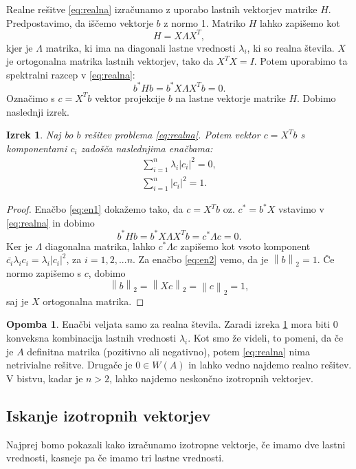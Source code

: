 \documentclass[12pt,a4paper]{amsart}
\theoremstyle{definition}
\newtheorem{opomba}[definicija]{Opomba}
\theoremstyle{plain}
\newtheorem{izrek}[definicija]{Izrek}
\newcommand{\abs}[1]{ \left\lvert#1\right\rvert}
\newcommand{\norm}[1]{\left\lVert#1\right\rVert}
\begin{document}
Realne rešitve \eqref{eq:realna} izračunamo z uporabo lastnih vektorjev matrike $H$. Predpostavimo, da iščemo vektorje $b$ z normo 1. Matriko $H$ lahko zapišemo kot $$H=X\Lambda X^T,$$ kjer je $\Lambda$ matrika, ki ima na diagonali lastne vrednosti $\lambda_i$, ki so realna števila. $X$ je ortogonalna matrika lastnih vektorjev, tako da $X^T X=I$. Potem uporabimo ta spektralni razcep v \eqref{eq:realna}: $$b^\ast Hb=b^\ast X\Lambda X^T b=0.$$ Označimo s $c=X^Tb$ vektor projekcije $b$ na lastne vektorje matrike $H$. Dobimo naslednji izrek.
\begin{izrek} \label{izrek2}
Naj bo $b$ rešitev problema \eqref{eq:realna}. Potem vektor $c=X^T b$ s komponentami $c_i$ zadošča naslednjima enačbama:
\begin{align}
\sum_{i=1}^{n} \lambda_i \abs{c_i}^2=0 \label{eq:en1},\\
\sum_{i=1}^{n}\abs{c_i}^2=1. \label{eq:en2}
\end{align}
\end{izrek}
\begin{proof}
Enačbo \eqref{eq:en1}  dokažemo tako, da $c=X^Tb$ oz. $c^\ast =b^\ast X$ vstavimo v \eqref{eq:realna} in dobimo $$b^\ast Hb=b^\ast X\Lambda X^T b= c^\ast \Lambda c=0.$$ Ker je $\Lambda$ diagonalna matrika, lahko $c^\ast \Lambda c$ zapišemo kot vsoto komponent $\bar{c_i}\lambda_i c_i=\lambda_i\abs{c_i}^2$, za $i=1,2,...n$.
Za enačbo \eqref{eq:en2} vemo, da je $\norm{b}_2=1$. Če normo zapišemo s $c$, dobimo $$\norm{b}_2=\norm{Xc}_2=\norm{c}_2=1,$$ saj je $X$ ortogonalna matrika.

\end{proof}
\begin{opomba}
Enačbi veljata samo za realna števila. Zaradi  izreka \ref{izrek2} mora biti 0 konveksna kombinacija lastnih vrednosti $\lambda_i$. Kot smo že videli, to pomeni, da če je $A$ definitna matrika (pozitivno ali negativno), potem \eqref{eq:realna}
nima netrivialne rešitve. Drugače je $0 \in W(A)$ in lahko vedno najdemo realno rešitev. V bistvu, kadar je $n>2$, lahko najdemo neskončno izotropnih vektorjev.
\end{opomba}
\subsection{Iskanje izotropnih vektorjev}
Najprej bomo pokazali kako izračunamo i\-zo\-trop\-ne vektorje, če imamo dve lastni vrednosti, kasneje pa če imamo tri lastne vrednosti.\\
\end{document}
